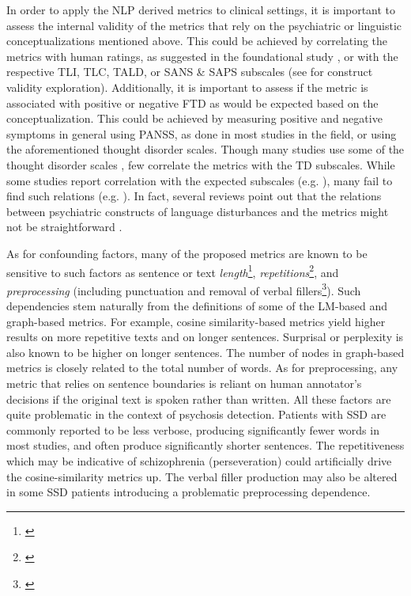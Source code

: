 In order to apply the NLP derived metrics to clinical settings, it is important to assess the internal validity of the metrics that rely on the psychiatric or linguistic conceptualizations mentioned above. This could be achieved by correlating the metrics with human ratings, as suggested in the foundational study \citet{elvevaag2007quantifying}, or with the respective TLI, TLC, TALD, or SANS \& SAPS subscales (see \citet{bilgrami2022construct} for construct validity exploration). Additionally, it is important to assess if the metric is associated with positive or negative FTD as would be expected based on the conceptualization. This could be achieved by measuring positive and negative symptoms in general using PANSS, as done in most %
studies in the field, or using the aforementioned thought disorder scales. Though many studies use some of the thought disorder scales %
, few correlate the metrics with the TD subscales. While some studies report correlation with the expected subscales (e.g. \citet{vail2018toward, just2020modeling, jeong2023exploring}), many fail to find such relations (e.g. \citet{bedi2015automated, corcoran2018prediction, iter2018automatic, hitczenko2021understanding}). In fact, several reviews point out that the relations between psychiatric constructs of language disturbances and the metrics might not be straightforward \citep{cohen2017can, holmlund2022towards}.

As for confounding factors, many of the proposed metrics are known to be sensitive to such factors as sentence or text \textit{length}\footnote{ \citet{elvevaag2007quantifying, mota2014graph, iter2018automatic, corcoran2018prediction, hitczenko2021understanding, parola2022speech, jeong2023exploring}}, \textit{repetitions}\footnote{\citet{elvevaag2007quantifying, iter2018automatic, just2019coherence}}, and \textit{preprocessing} (including punctuation and removal of verbal fillers\footnote{\citet{parola2022speech, holmlund2022towards}}). Such dependencies stem naturally from the definitions of some of the LM-based and graph-based metrics. For example, cosine similarity-based metrics yield higher results on more repetitive texts and on longer sentences. Surprisal or perplexity is also known to be higher on longer sentences. The number of nodes in graph-based metrics is closely related to the total number of words. As for preprocessing, any metric that relies on sentence boundaries is reliant on human annotator's decisions if the original text is spoken rather than written. All these factors are quite problematic in the context of psychosis detection. Patients with SSD are commonly reported to be less verbose, producing significantly fewer words in most studies, and often produce significantly shorter sentences. The repetitiveness which may be indicative of schizophrenia (perseveration) could artificially drive the cosine-similarity metrics up. The verbal filler production may also be altered in some SSD patients introducing a problematic preprocessing dependence. 


